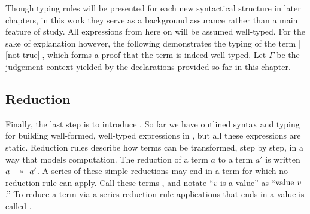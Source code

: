 Though typing rules will be presented for each new syntactical structure in later chapters, in this work they serve as a background assurance rather than a main feature of study.
All expressions from here on will be assumed well-typed.
For the sake of explanation however, the following demonstrates the typing of the term \code|[not true]|, which forms a proof that the term is indeed well-typed.
Let $Γ$ be the judgement context yielded by the declarations provided so far in this chapter.
%
%

\newpage
\subsection{Reduction}
\label{sec:LangA-reduction}

Finally, the last step is to introduce .
So far we have outlined syntax and typing for building well-formed, well-typed expressions in \LangA, but all these expressions are static.
Reduction rules describe how terms can be transformed, step by step, in a way that models computation.
The reduction of a term $a$ to a term $a'$ is written $a \hspace{0.4em}\twoheadrightarrow\hspace{0.4em} a'$.
A series of these simple reductions may end in a term for which no reduction rule can apply. Call these terms , and notate ``$v$ is a value'' as ``$\mathrm{value}~v$.''
To reduce a term via a series reduction-rule-applications that ends in a value is called .

